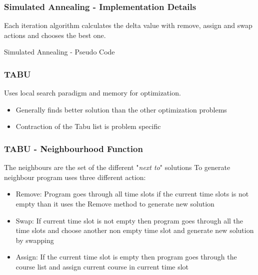\documentclass{beamer}
\makeatletter
\newenvironment{algorithm}[1][]{%
  \def\@captype{algorithm}%
  \par\nobreak\begin{center}\nobreak}
  {\par\nobreak\end{center}\nobreak}
\newcounter{algorithm}
\makeatother
\begin{document}
\begin{frame}[shrink=20]
\frametitle{Simulated Annealing  - Implementation Details}
Each iteration algorithm calculates the delta value with remove, assign and swap actions and chooses the best one. 
\begin{algorithm}[H]
\begin{algorithmic}[1]
\REPEAT
\REPEAT
{}
\ENDIF
{}
\end{algorithmic}
\caption{Simulated Annealing - Pseudo Code}
\label{alg:seq}
\end{algorithm}
\end{frame}

\begin{frame}
\frametitle{TABU}
Uses local search paradigm and memory for optimization.
\begin{itemize}
\item Generally finds better solution than the other optimization problems
\item Contraction of the Tabu list is problem specific
\end{itemize}
\end{frame}

\begin{frame}
\frametitle{TABU - Neighbourhood Function}
The neighbours are the set of the different "\textit{next to}" solutions
To generate neighbour program uses three different action:
\begin{itemize}
\item Remove: Program goes through all time slots if the current time slots is not empty than it uses the Remove method to generate new solution
\item Swap: If current time slot is not empty then program goes through all the time slots and choose another non empty time slot and generate new solution by swapping
\item Assign: If the current time slot is empty then program goes through the course list and assign current course in current time slot
\end{itemize}
\end{frame}
\end{document}
